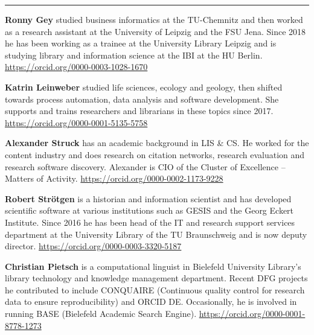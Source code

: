 \documentclass[a4paper,
fontsize=11pt,
oneside,
numbers=noperiodatend,
parskip=half-,
bibliography=totoc,
final
]{scrartcl}
\begin{document}
\begin{center}\rule{0.5\linewidth}{0.5pt}\end{center}

\textbf{Ronny Gey} studied business informatics at the TU-Chemnitz and
then worked as a research assistant at the University of Leipzig and the
FSU Jena. Since 2018 he has been working as a trainee at the University
Library Leipzig and is studying library and information science at the
IBI at the HU Berlin. \url{https://orcid.org/0000-0003-1028-1670}

\textbf{Katrin Leinweber} studied life sciences, ecology and geology,
then shifted towards process automation, data analysis and software
development. She supports and trains researchers and librarians in these
topics since 2017. \url{https://orcid.org/0000-0001-5135-5758}

\textbf{Alexander Struck} has an academic background in LIS \& CS. He
worked for the content industry and does research on citation networks,
research evaluation and research software discovery. Alexander is CIO of
the Cluster of Excellence -- Matters of Activity.
\url{https://orcid.org/0000-0002-1173-9228}

\textbf{Robert Strötgen} is a historian and information scientist and
has developed scientific software at various institutions such as GESIS
and the Georg Eckert Institute. Since 2016 he has been head of the IT
and research support services department at the University Library of
the TU Braunschweig and is now deputy director.
\url{https://orcid.org/0000-0003-3320-5187}

\textbf{Christian Pietsch} is a computational linguist in Bielefeld
University Library's library technology and knowledge management
department. Recent DFG projects he contributed to include CONQUAIRE
(Continuous quality control for research data to ensure reproducibility)
and ORCID DE. Occasionally, he is involved in running BASE (Bielefeld
Academic Search Engine). \url{https://orcid.org/0000-0001-8778-1273}
\end{document}
